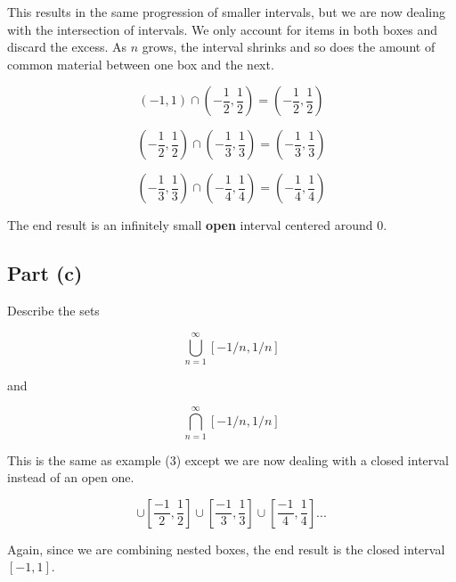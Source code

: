 \documentclass{article}
\begin{document}
This results in the same progression of smaller intervals, but we are now dealing with the intersection of intervals.
We only account for items in both boxes and discard the excess.
As $n$ grows, the interval shrinks and so does the amount of common material between one box and the next.

\begin{equation}
	(-1,1) \cap (-\frac{1}{2},\frac{1}{2}) = (-\frac{1}{2},\frac{1}{2})
\end{equation}

\begin{equation}
	(-\frac{1}{2},\frac{1}{2}) \cap (-\frac{1}{3},\frac{1}{3}) = (-\frac{1}{3},\frac{1}{3})
\end{equation}

\begin{equation}
	(-\frac{1}{3},\frac{1}{3}) \cap (-\frac{1}{4},\frac{1}{4}) = (-\frac{1}{4},\frac{1}{4})
\end{equation}

The end result is an infinitely small {\bf open} interval centered around $0$.

\subsection{Part (c)}

Describe the sets

\begin{equation}
	\bigcup_{n=1}^{\infty}[-1/n,1/n]
\end{equation}

and

\begin{equation}
	\bigcap_{n=1}^{\infty}[-1/n,1/n]
\end{equation}

This is the same as example (3) except we are now dealing with a closed interval instead of an open one.

\begin{equation}
	[-1,1] \cup [\frac{-1}{2},\frac{1}{2}]\cup [\frac{-1}{3},\frac{1}{3}]\cup [\frac{-1}{4},\frac{1}{4}] ...
\end{equation}

Again, since we are combining nested boxes, the end result is the closed interval $[-1, 1]$.

\paragraph{}
\end{document}
